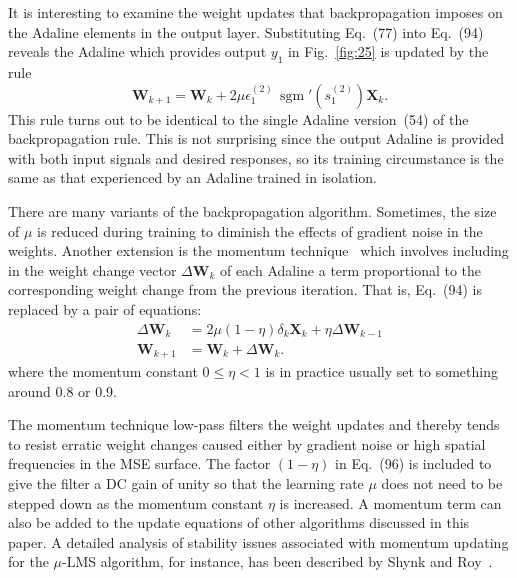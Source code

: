 \documentclass[10pt,twocolumn]{article}
\newcommand{\X}{\bm{X}}
\newcommand{\W}{\bm{W}}
\newcommand{\sgm}{\operatorname{sgm}}
\begin{document}
It is interesting to examine the weight updates that backpropagation imposes on the
Adaline elements in the output layer. Substituting Eq.~(77) into Eq.~(94) reveals
the Adaline which provides output $y_1$ in Fig.~\ref{fig:25} is updated by the rule
\begin{equation}
\W_{k+1} = \W_k + 2\mu\epsilon_1^{(2)}\,\sgm'(s_1^{(2)})\X_k. \tag{95}
\end{equation}
This rule turns out to be identical to the single Adaline version~(54) of the
backpropagation rule. This is not surprising since the output Adaline is provided
with both input signals and desired responses, so its training circumstance is the
same as that experienced by an Adaline trained in isolation.

There are many variants of the backpropagation algorithm. Sometimes, the size of
$\mu$ is reduced during training to diminish the effects of gradient noise in the
weights. Another extension is the momentum technique~\cite{rhw86} which involves
including in the weight change vector $\Delta\W_k$ of each Adaline a term
proportional to the corresponding weight change from the previous iteration. That
is, Eq.~(94) is replaced by a pair of equations:
\begin{align}
\Delta\W_k &= 2\mu(1-\eta)\delta_k\X_k + \eta\Delta\W_{k-1} \tag{96}\\
\W_{k+1} &= \W_k + \Delta\W_k. \tag{97}
\end{align}
where the momentum constant $0 \le \eta < 1$ is in practice usually set to
something around 0.8 or 0.9.

The momentum technique low-pass filters the weight updates and thereby tends to
resist erratic weight changes caused either by gradient noise or high spatial
frequencies in the MSE surface. The factor $(1-\eta)$ in Eq.~(96) is included to
give the filter a DC gain of unity so that the learning rate $\mu$ does not need to
be stepped down as the momentum constant $\eta$ is increased. A momentum term can
also be added to the update equations of other algorithms discussed in this paper.
A detailed analysis of stability issues associated with momentum updating for the
$\mu$-LMS algorithm, for instance, has been described by Shynk and Roy~\cite{shynk}.
\end{document}
